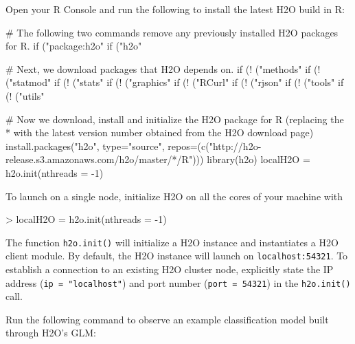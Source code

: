 \documentclass{article}[11pt]
\begin{document}
\noindent
Open your R Console and run the following to install the latest H2O build in R:

\footnotesize %
\begin{spverbatim}
# The following two commands remove any previously installed H2O packages for R.
if ("package:h2o" %
if ("h2o" %

# Next, we download packages that H2O depends on.
if (! ("methods" %
if (! ("statmod" %
if (! ("stats" %
if (! ("graphics" %
if (! ("RCurl" %
if (! ("rjson" %
if (! ("tools" %
if (! ("utils" %
\end{spverbatim}
\begin{spverbatim}
# Now we download, install and initialize the H2O package for R (replacing
the * with the latest version number obtained from the H2O download page)
install.packages("h2o", type="source", repos=(c("http://h2o-release.s3.amazonaws.com/h2o/master/*/R")))
library(h2o)
localH2O = h2o.init(nthreads = -1)
\end{spverbatim}
\normalsize%
\noindent
To launch on a single node, initialize H2O on all the cores of your machine with

\begin{spverbatim}
> localH2O = h2o.init(nthreads = -1)

\end{spverbatim}
\noindent
The function \texttt{h2o.init()} will initialize a H2O instance and instantiates a H2O client module. By default, the H2O instance will launch on \texttt{localhost:54321}. To establish a connection to an existing H2O cluster node, explicitly state the IP address (\texttt{ip = "localhost"}) and port number (\texttt{port = 54321}) in the \texttt{h2o.init()} call.

\noindent
Run the following command to observe an example classification model built through H2O's GLM:
\end{document}
